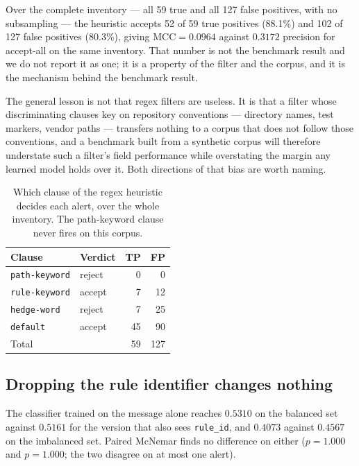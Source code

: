 \documentclass[journal]{IEEEtran}
\theoremstyle{definition}
\newcommand{\RNtp}{59}
\newcommand{\RNfp}{127}
\newcommand{\RTfidfBalMcc}{0.5161}
\newcommand{\RMsgBalMcc}{0.5310}
\newcommand{\RTfidfImbMcc}{0.4567}
\newcommand{\RMsgImbMcc}{0.4073}
\newcommand{\RMsgSame}{1.000}
\newcommand{\RMsgSameImb}{1.000}
\newcommand{\CHeurFullTP}{52}
\newcommand{\CHeurFullFP}{102}
\newcommand{\CHeurFullMcc}{0.0964}
\newcommand{\CHeurAccTpPct}{88.1}
\newcommand{\CHeurAccFpPct}{80.3}
\newcommand{\CAllPrec}{0.3172}
\begin{document}
Over the complete inventory --- all \RNtp{} true and all \RNfp{} false
positives, with no subsampling --- the heuristic accepts \CHeurFullTP{} of
\RNtp{} true positives (\CHeurAccTpPct\%) and \CHeurFullFP{} of \RNfp{} false
positives (\CHeurAccFpPct\%), giving
$\mathrm{MCC} = \CHeurFullMcc$ against $\CAllPrec$ precision for accept-all on
the same inventory. That number is not the benchmark result and we do not
report it as one; it is a property of the filter and the corpus, and it is the
mechanism behind the benchmark result.

The general lesson is not that regex filters are useless. It is that a filter
whose discriminating clauses key on repository conventions --- directory names,
test markers, vendor paths --- transfers nothing to a corpus that does not
follow those conventions, and a benchmark built from a synthetic corpus will
therefore understate such a filter's field performance while overstating the
margin any learned model holds over it. Both directions of that bias are worth
naming.

\begin{table}[t]
\centering
\caption{Which clause of the regex heuristic decides each alert, over the whole
inventory. The path-keyword clause never fires on this corpus.}
\label{tab:heurclause}
\footnotesize
\setlength{\tabcolsep}{5pt}
\begin{tabular}{@{}llrr@{}}
\toprule
Clause & Verdict & TP & FP \\
\midrule
\texttt{path-keyword} & reject & 0 & 0 \\
\texttt{rule-keyword} & accept & 7 & 12 \\
\texttt{hedge-word} & reject & 7 & 25 \\
\texttt{default} & accept & 45 & 90 \\
\midrule
Total & & \RNtp & \RNfp \\
\bottomrule
\end{tabular}
\end{table}

\subsection{Dropping the rule identifier changes nothing}

The classifier trained on the message alone reaches $\RMsgBalMcc$ on the
balanced set against $\RTfidfBalMcc$ for the version that also sees
\texttt{rule\_id}, and $\RMsgImbMcc$ against $\RTfidfImbMcc$ on the imbalanced
set. Paired McNemar finds no difference on either
($p = \RMsgSame$ and $p = \RMsgSameImb$; the two disagree on at most one alert).
\end{document}

